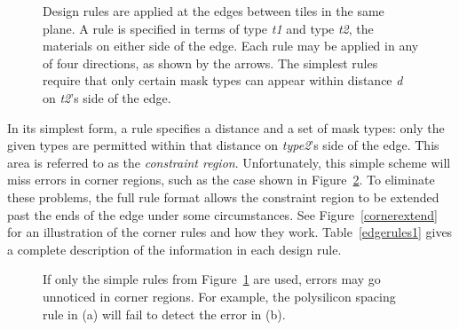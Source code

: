 \documentclass[letterpaper,twoside,12pt]{article}
\begin{document}
\begin{figure}[ht]
   \begin{center}
      \caption{Design rules are applied at the edges between tiles in
	the same plane.  A rule is specified in terms of type {\itshape t1}
	and type {\itshape t2}, the materials on either side of the edge.
	Each rule may be applied in any of four directions, as shown by
	the arrows.  The simplest rules require that only certain mask types
	can appear within distance {\itshape d} on {\itshape t2}'s side of
	the edge.}
      \label{tileedge}
   \end{center}
\end{figure}

In its simplest form, a rule specifies a distance
and a set of mask types:  only the given types are permitted
within that distance on {\itshape type2}'s side of the edge.
This area is referred to as the {\itshape constraint region}.
Unfortunately, this simple scheme will miss errors
in corner regions, such as the case shown in Figure~\ref{cornererror}.
To eliminate these problems, the full rule format allows the constraint
region to be extended past the ends of the edge under some
circumstances.
See Figure~\ref{cornerextend} for an illustration of the
corner rules and how they work.
Table~\ref{edgerules1} gives a complete
description of the information in each design rule.

\begin{figure}[hb!]
   \begin{center}
      \caption{If only the simple rules from Figure~\ref{tileedge} are used, errors
	may go unnoticed in corner regions.  For example, the polysilicon
	spacing rule in (a) will fail to detect the error in (b).}
      \label{cornererror}
   \end{center}
\end{figure}
\end{document}
